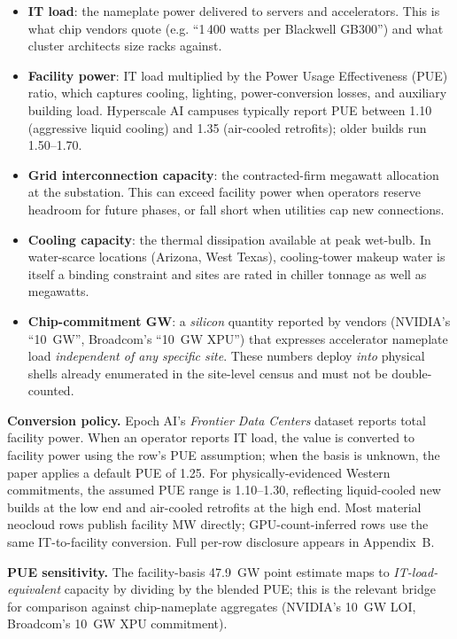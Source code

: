 \documentclass[11pt,a4paper]{article}
\begin{document}
\begin{itemize}\itemsep2pt
\item \textbf{IT load}: the nameplate power delivered to servers and accelerators. This is what chip vendors quote (e.g. ``1\,400 watts per Blackwell GB300'') and what cluster architects size racks against.
\item \textbf{Facility power}: IT load multiplied by the Power Usage Effectiveness (PUE) ratio, which captures cooling, lighting, power-conversion losses, and auxiliary building load. Hyperscale AI campuses typically report PUE between 1.10 (aggressive liquid cooling) and 1.35 (air-cooled retrofits); older builds run 1.50--1.70.
\item \textbf{Grid interconnection capacity}: the contracted-firm megawatt allocation at the substation. This can exceed facility power when operators reserve headroom for future phases, or fall short when utilities cap new connections.
\item \textbf{Cooling capacity}: the thermal dissipation available at peak wet-bulb. In water-scarce locations (Arizona, West Texas), cooling-tower makeup water is itself a binding constraint and sites are rated in chiller tonnage as well as megawatts.
\item \textbf{Chip-commitment GW}: a \emph{silicon} quantity reported by vendors (NVIDIA's ``10~GW'', Broadcom's ``10~GW XPU'') that expresses accelerator nameplate load \emph{independent of any specific site}. These numbers deploy \emph{into} physical shells already enumerated in the site-level census and must not be double-counted.
\end{itemize}

\textbf{Conversion policy.} Epoch AI's \emph{Frontier Data Centers} dataset reports total facility power. When an operator reports IT load, the value is converted to facility power using the row's PUE assumption; when the basis is unknown, the paper applies a default PUE of 1.25. For physically-evidenced Western commitments, the assumed PUE range is 1.10--1.30, reflecting liquid-cooled new builds at the low end and air-cooled retrofits at the high end. Most material neocloud rows publish facility MW directly; GPU-count-inferred rows use the same IT-to-facility conversion. Full per-row disclosure appears in Appendix~B.

\textbf{PUE sensitivity.} The facility-basis 47.9~GW point estimate maps to \emph{IT-load-equivalent} capacity by dividing by the blended PUE; this is the relevant bridge for comparison against chip-nameplate aggregates (NVIDIA's 10~GW LOI, Broadcom's 10~GW XPU commitment).
\end{document}
